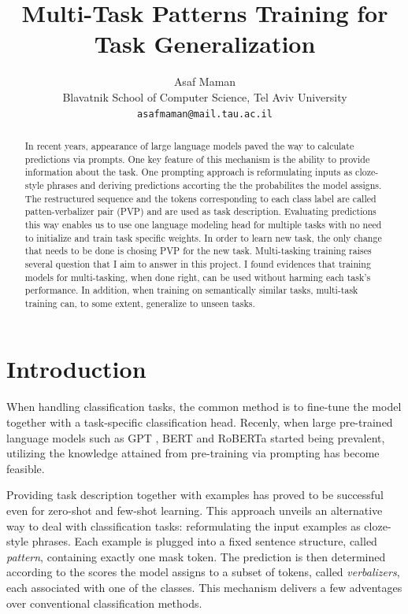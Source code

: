 \documentclass[11pt,a4paper]{article}
\title{Multi-Task Patterns Training for Task Generalization}
\author{Asaf Maman \\
  Blavatnik School of Computer Science, Tel Aviv University \\
  \texttt{asafmaman@mail.tau.ac.il} \\}
\date{}
\begin{document}
\maketitle

\begin{abstract}
In recent years, appearance of large language models paved the way to calculate predictions via prompts.
One key feature of this mechanism is the ability to provide information about the task.
One prompting approach is reformulating inputs as cloze-style phrases and deriving predictions accorting the the probabilites the model assigns.
The restructured sequence and the tokens corresponding to each class label are called patten-verbalizer pair (PVP) and are used as task description.
Evaluating predictions this way enables us to use one language modeling head for multiple tasks with no need to initialize and train task specific weights.
In order to learn new task, the only change that needs to be done is chosing PVP for the new task. 
Multi-tasking training raises several question that I aim to answer in this project.
I found evidences that training models for multi-tasking, when done right, can be used without harming each task's performance.
In addition, when training on semantically similar tasks, multi-task training can, to some extent, generalize to unseen tasks.
\end{abstract}


\section{Introduction}

When handling classification tasks, the common method is to fine-tune the model together with a task-specific classification head.
Recenly, when large pre-trained language models such as GPT \citep{radford2018improving}, BERT \citep{devlin2019bert} and RoBERTa \citep{liu2019roberta} started being prevalent, utilizing the knowledge attained from pre-training via prompting has become feasible.

Providing task description together with examples has proved to be successful \citep{radford2019language} even for zero-shot and few-shot learning.
This approach unveils an alternative way to deal with classification tasks: reformulating the input examples as cloze-style phrases.
Each example is plugged into a fixed sentence structure, called \textit{pattern}, containing exactly one mask token.
The prediction is then determined according to the scores the model assigns to a subset of tokens, called \textit{verbalizers}, each associated with one of the classes.
This mechanism delivers a few adventages over conventional classification methods.
\end{document}
